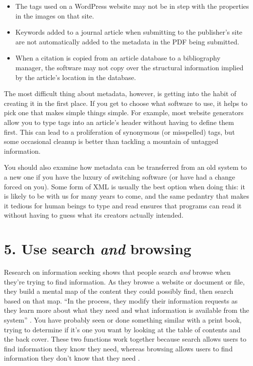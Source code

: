 \documentclass[10pt,letterpaper]{article}
\newcommand{\rulemajor}[1]{\section*{#1}}
\begin{document}
\begin{itemize}

\item
  The tags used on a WordPress website may not be in step with the properties in
  the images on that site.

\item
  Keywords added to a journal article when submitting to the publisher's site
  are not automatically added to the metadata in the PDF being submitted.

\item
  When a citation is copied from an article database to a bibliography manager,
  the software may not copy over the structural information implied by the
  article's location in the database.

\end{itemize}

The most difficult thing about metadata, however, is getting into the habit of
creating it in the first place. If you get to choose what software to use, it
helps to pick one that makes simple things simple. For example, most website
generators allow you to type tags into an article's header without having to
define them first. This can lead to a proliferation of synonymous (or
misspelled) tags, but some occasional cleanup is better than tackling a mountain
of untagged information.

You should also examine how metadata can be transferred from an old system to a
new one if you have the luxury of switching software (or have had a change
forced on you). Some form of XML is usually the best option when doing this: it
is likely to be with us for many years to come, and the same pedantry that makes
it tedious for human beings to type and read ensures that programs can read it
without having to guess what its creators actually intended.

\rulemajor{5. Use search \emph{and} browsing}

Research on information seeking shows that people search \emph{and} browse when
they're trying to find information. As they browse a website or document or
file, they build a mental map of the content they could possibly find, then
search based on that map. ``In the process, they modify their information
requests as they learn more about what they need and what information is
available from the system'' \cite{Rosenfeld2015}. You have probably seen or done
something similar with a print book, trying to determine if it's one you want by
looking at the table of contents and the back cover. These two functions work
together because search allows users to find information they know they need,
whereas browsing allows users to find information they don't know that they need
\cite{Bates2002}.
\end{document}
